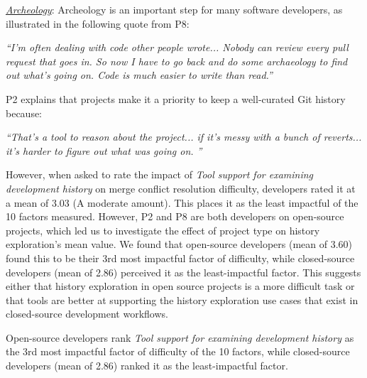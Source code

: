 \underline{\textit{Archeology}}:
Archeology is an important step for many software developers, as illustrated in the following quote from P8:
\begin{displayquote}
\textit{``I'm often dealing with code other people wrote... Nobody can review every pull request that goes in. So now I have to go back and do some archaeology to find out what's going on. Code is much easier to write than read.''}
\end{displayquote}
P2 explains that projects make it a priority to keep a well-curated Git history because:
\begin{displayquote}
\textit{``That's a tool to reason about the project... if it's messy with a bunch of reverts... it's harder to figure out what was going on.	''}
\end{displayquote}

However, when asked to rate the impact of \textit{Tool support for examining development history} on merge conflict resolution difficulty, developers rated it at a mean of 3.03 (A moderate amount). This places it as the least impactful of the 10 factors measured. However, P2 and P8 are both developers on open-source projects, which led us to investigate the effect of project type on history exploration's mean value. We found that open-source developers (mean of 3.60) found this to be their 3rd most impactful factor of difficulty, while closed-source developers (mean of 2.86) perceived it as the least-impactful factor. This suggests either that history exploration in open source projects is a more difficult task or that tools are better at supporting the history exploration use cases that exist in closed-source development workflows.
\begin{tcolorbox}[enhanced,minipage boxed title,enhanced,title={Takeaway \arabic{takeawaycounter}},
attach boxed title to top left=
{xshift=0mm,yshift=-1mm},
boxed title style={size=small}]
Open-source developers rank \textit{Tool support for examining development history} as the 3rd most impactful factor of difficulty of the 10 factors, while closed-source developers (mean of 2.86) ranked it as the least-impactful factor.
\end{tcolorbox}
\addtocounter{takeawaycounter}{1}

